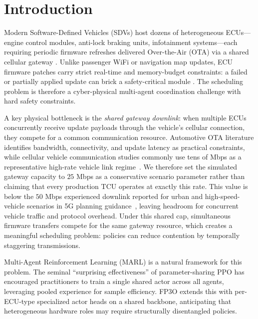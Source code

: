 \documentclass[conference]{IEEEtran}
\begin{document}
\section{Introduction}

Modern Software-Defined Vehicles (SDVs) host dozens of heterogeneous ECUs---engine
control modules, anti-lock braking units, infotainment systems---each requiring periodic
firmware refreshes delivered Over-the-Air (OTA) via a shared cellular gateway
\cite{b1,halder2020ota}. Unlike passenger WiFi or navigation map updates, ECU firmware
patches carry strict real-time and memory-budget constraints: a failed or partially
applied update can brick a safety-critical module \cite{b1}. The scheduling problem
is therefore a cyber-physical multi-agent coordination challenge with hard safety
constraints.

A key physical bottleneck is the \emph{shared gateway downlink}: when multiple ECUs
concurrently receive update payloads through the vehicle's cellular connection, they
compete for a common communication resource. Automotive OTA literature identifies
bandwidth, connectivity, and update latency as practical constraints, while cellular
vehicle communication studies commonly use tens of Mbps as a representative high-rate
vehicle link regime~\cite{halder2020ota,scalota,gsma5g}. We therefore set the simulated
gateway capacity to $25$ Mbps as a conservative scenario parameter rather than claiming
that every production TCU operates at exactly this rate. This value is below the
$50$ Mbps experienced downlink reported for urban and high-speed-vehicle scenarios in
5G planning guidance~\cite{gsma5g}, leaving headroom for concurrent vehicle traffic
and protocol overhead. Under this shared cap, simultaneous firmware transfers compete
for the same gateway resource, which creates a meaningful scheduling problem: policies
can reduce contention by temporally staggering transmissions.

Multi-Agent Reinforcement Learning (MARL) is a natural framework for this problem.
The seminal ``surprising effectiveness'' of parameter-sharing PPO \cite{b3} has encouraged
practitioners to train a single shared actor across all agents, leveraging pooled
experience for sample efficiency. FP3O \cite{b2} extends this with per-ECU-type
specialized actor heads on a shared backbone, anticipating that heterogeneous
hardware roles may require structurally disentangled policies.
\end{document}
